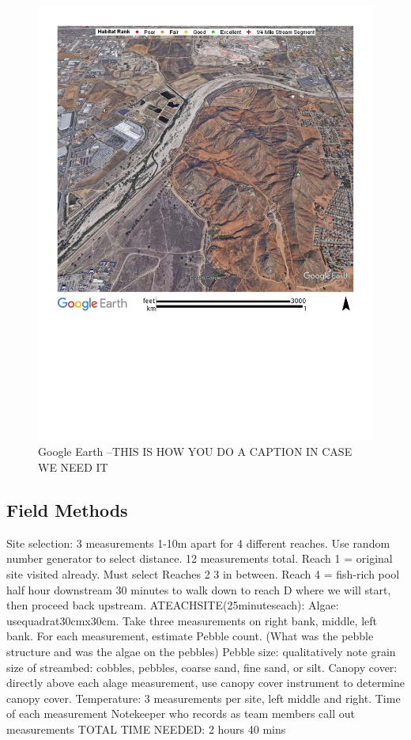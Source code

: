 \documentclass{article}
\begin{document}
\begin{figure}
\includegraphics[width=1.00\textwidth]{Figures/SantaAna_SatelliteImage}
\caption{Google Earth --THIS IS HOW YOU DO A CAPTION IN CASE WE NEED IT}
\label{SAR_Image}
\end{figure}

\subsection{Field Methods}
Site selection: 3 measurements 1-10m apart for 4 diﬀerent reaches. Use random number generator to select distance. 12 measurements total. Reach 1 = original site visited already. Must select Reaches 2 3 in between. Reach 4 = ﬁsh-rich pool half hour downstream 30 minutes to walk down to reach D where we will start, then proceed back upstream. ATEACHSITE(25minuteseach): Algae: usequadrat30cmx30cm. Take three measurements on right bank, middle, left bank. For each measurement, estimate Pebble count. (What was the pebble structure and was the algae on the pebbles) Pebble size: qualitatively note grain size of streambed: cobbles, pebbles, coarse sand, ﬁne sand, or silt. Canopy cover: directly above each alage measurement, use canopy cover instrument to determine canopy cover. Temperature: 3 measurements per site, left middle and right. Time of each measurement Notekeeper who records as team members call out measurements TOTAL TIME NEEDED: 2 hours 40 mins
\end{document}
